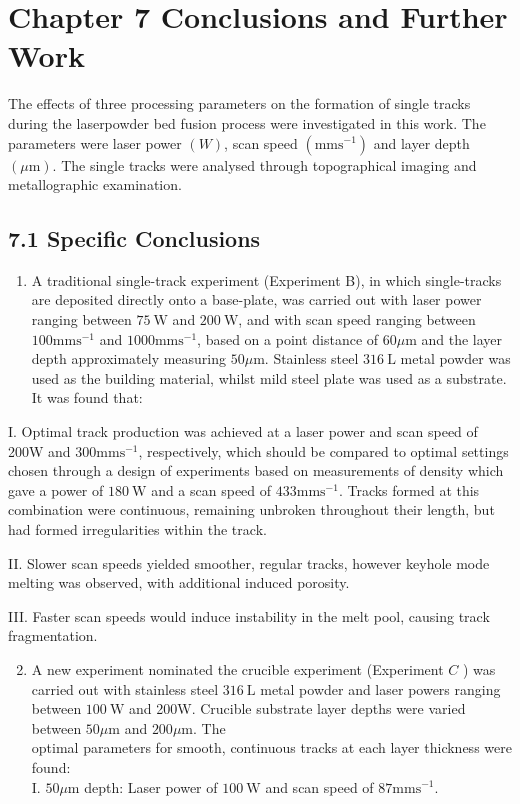 \documentclass[10pt]{article}
\begin{document}
\section*{Chapter 7 Conclusions and Further Work}
The effects of three processing parameters on the formation of single tracks during the laserpowder bed fusion process were investigated in this work. The parameters were laser power $(W)$, scan speed $\left(\mathrm{mms}^{-1}\right)$ and layer depth $(\mu \mathrm{m})$. The single tracks were analysed through topographical imaging and metallographic examination.

\subsection*{7.1 Specific Conclusions}
\begin{enumerate}
  \item A traditional single-track experiment (Experiment B), in which single-tracks are deposited directly onto a base-plate, was carried out with laser power ranging between $75 \mathrm{~W}$ and $200 \mathrm{~W}$, and with scan speed ranging between $100 \mathrm{mms}^{-1}$ and $1000 \mathrm{mms}^{-1}$, based on a point distance of $60 \mu \mathrm{m}$ and the layer depth approximately measuring $50 \mu \mathrm{m}$. Stainless steel $316 \mathrm{~L}$ metal powder was used as the building material, whilst mild steel plate was used as a substrate. It was found that:
\end{enumerate}

I. Optimal track production was achieved at a laser power and scan speed of 200W and $300 \mathrm{mms}^{-1}$, respectively, which should be compared to optimal settings chosen through a design of experiments based on measurements of density which gave a power of $180 \mathrm{~W}$ and a scan speed of $433 \mathrm{mms}^{-1}$. Tracks formed at this combination were continuous, remaining unbroken throughout their length, but had formed irregularities within the track.

II. Slower scan speeds yielded smoother, regular tracks, however keyhole mode melting was observed, with additional induced porosity.

III. Faster scan speeds would induce instability in the melt pool, causing track fragmentation.

\begin{enumerate}
  \setcounter{enumi}{1}
  \item A new experiment nominated the crucible experiment (Experiment $C$ ) was carried out with stainless steel $316 \mathrm{~L}$ metal powder and laser powers ranging between $100 \mathrm{~W}$ and 200W. Crucible substrate layer depths were varied between $50 \mu \mathrm{m}$ and $200 \mu \mathrm{m}$. The\\
optimal parameters for smooth, continuous tracks at each layer thickness were found:\\
I. $50 \mu \mathrm{m}$ depth: Laser power of $100 \mathrm{~W}$ and scan speed of $87 \mathrm{mms}^{-1}$.
\end{enumerate}
\end{document}
